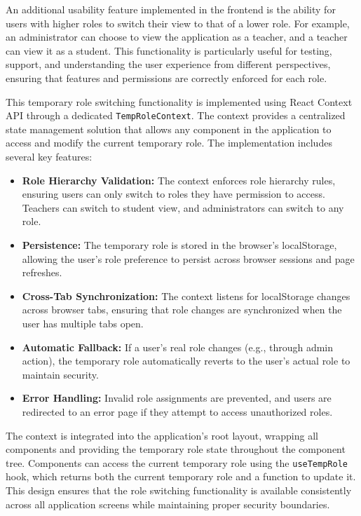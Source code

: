 An additional usability feature implemented in the frontend is the ability for users with higher roles to switch their view to that of a lower role. For example, an administrator can choose to view the application as a teacher, and a teacher can view it as a student. This functionality is particularly useful for testing, support, and understanding the user experience from different perspectives, ensuring that features and permissions are correctly enforced for each role.

This temporary role switching functionality is implemented using React Context API through a dedicated \texttt{TempRoleContext}. The context provides a centralized state management solution that allows any component in the application to access and modify the current temporary role. The implementation includes several key features:

\begin{itemize}
    \item \textbf{Role Hierarchy Validation:} The context enforces role hierarchy rules, ensuring users can only switch to roles they have permission to access. Teachers can switch to student view, and administrators can switch to any role.
    \item \textbf{Persistence:} The temporary role is stored in the browser's localStorage, allowing the user's role preference to persist across browser sessions and page refreshes.
    \item \textbf{Cross-Tab Synchronization:} The context listens for localStorage changes across browser tabs, ensuring that role changes are synchronized when the user has multiple tabs open.
    \item \textbf{Automatic Fallback:} If a user's real role changes (e.g., through admin action), the temporary role automatically reverts to the user's actual role to maintain security.
    \item \textbf{Error Handling:} Invalid role assignments are prevented, and users are redirected to an error page if they attempt to access unauthorized roles.
\end{itemize}

The context is integrated into the application's root layout, wrapping all components and providing the temporary role state throughout the component tree. Components can access the current temporary role using the \texttt{useTempRole} hook, which returns both the current temporary role and a function to update it. This design ensures that the role switching functionality is available consistently across all application screens while maintaining proper security boundaries.

